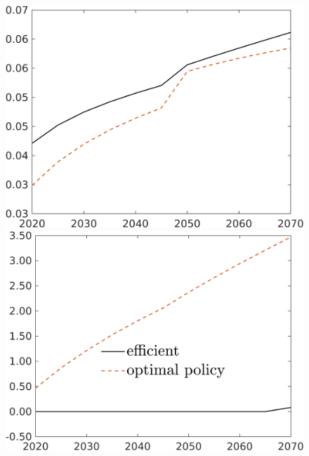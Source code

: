 \begin{figure}[h!!]
\begin{minipage}[]{0.32\textwidth}
	\end{minipage}
	\begin{minipage}[]{0.32\textwidth}
		\includegraphics[width=1\textwidth]{../../codding_model/own_basedOnFried/optimalPol_190722_tidiedUp/figures/all_Aout22/hl_PercentageBAUDyn_Target_regime3_spillover0_noskill1_sep1_xgrowth0_etaa0.79_lgd0.png}
	\end{minipage}
	\begin{minipage}[]{0.32\textwidth}
		\includegraphics[width=1\textwidth]{../../codding_model/own_basedOnFried/optimalPol_190722_tidiedUp/figures/all_Aout22/AgAf_PercentageEffOptDyn_Target_regime3_spillover0_noskill1_sep1_xgrowth0_etaa0.79_lgd1.png}

\end{minipage}
\end{figure}
